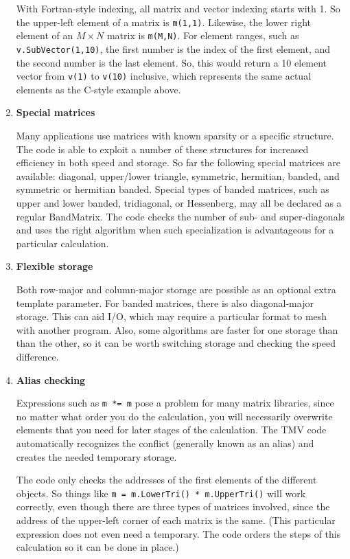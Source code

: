 \documentclass[twoside,letterpaper,11pt]{article}
\renewcommand{\tt}[1]{{\texttt {#1}}}
\begin{document}
\begin{enumerate}
With Fortran-style indexing, all matrix and vector indexing starts with 1.
So the upper-left element of a matrix is \tt{m(1,1)}.  Likewise, the lower right
element of an $M \times N$ matrix is \tt{m(M,N)}.  For element ranges, such as
\tt{v.SubVector(1,10)}, the first number is the index of the first element, and
the second number is the last element.  So, this would return a 10 element vector
from \tt{v(1)} to \tt{v(10)} inclusive, which represents the same actual elements 
as the C-style example above.

\item
\textbf{Special matrices}

Many applications use matrices with known sparsity or a specific structure.  
The code is able to exploit a number of these structures for increased
efficiency in both speed and storage.  So far the following special matrices are
available: diagonal, upper/lower triangle, symmetric, hermitian, banded, and 
symmetric or hermitian banded.  
Special types of banded matrices, such as 
upper and lower banded, tridiagonal, or Hessenberg, may all be declared as a 
regular BandMatrix.  The code checks the number of sub- and super-diagonals 
and uses the right algorithm when such specialization is advantageous for a 
particular calculation.

\item
\textbf{Flexible storage}

Both row-major and column-major storage are possible as an optional
extra template parameter.
For banded matrices, there is also diagonal-major storage.
This can aid I/O, which may require a particular format to mesh with another
program.  Also, some algorithms 
are faster for one storage than than the other, so it can be worth switching storage
and checking the speed difference.

\item
\textbf{Alias checking}

Expressions such as \tt{m *= m} pose a problem for many matrix libraries, since
no matter what order you do the calculation, you will necessarily overwrite elements 
that you need for later stages of the calculation.  
The TMV code automatically recognizes the
conflict (generally known as an alias) and creates the needed temporary storage.

The code only checks the addresses of the first elements of the different objects.
So things like \tt{m = m.LowerTri() * m.UpperTri()} will work
correctly, even though there are three types of matrices involved, since the 
address of the upper-left corner of each matrix is the same.  (This particular
expression does not even need a temporary.  The code orders the steps of this
calculation so it can be done in place.)


\end{enumerate}
\end{document}
